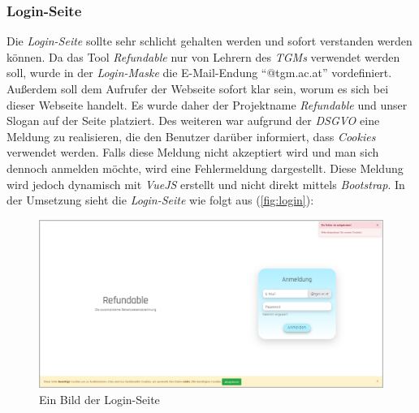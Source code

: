 \subsubsection{Login-Seite}
\label{chapter:implementierung-frontend-komponenten-login}
Die \textit{Login-Seite} sollte sehr schlicht gehalten werden und sofort verstanden werden können. Da das Tool \textit{Refundable} nur von Lehrern des \textit{TGMs} verwendet werden soll, wurde in der \textit{Login-Maske} die E-Mail-Endung \enquote{@tgm.ac.at} vordefiniert. Außerdem soll dem Aufrufer der Webseite sofort klar sein, worum es sich bei dieser Webseite handelt. Es wurde daher der Projektname \textit{Refundable} und unser Slogan auf der Seite platziert. Des weiteren war aufgrund der \textit{DSGVO} eine Meldung zu realisieren, die den Benutzer darüber informiert, dass \textit{Cookies} verwendet werden. Falls diese Meldung nicht akzeptiert wird und man sich dennoch anmelden möchte, wird eine Fehlermeldung dargestellt. Diese Meldung wird jedoch dynamisch mit \textit{VueJS} erstellt und nicht direkt mittels \textit{Bootstrap}. In der Umsetzung sieht die \textit{Login-Seite} wie folgt aus (\autoref{fig:login}):
\begin{figure}[H]
	\centering
	\includegraphics[width=1\linewidth]{images/ldehner_implementierung/login}
	\caption[Login Seite]{Ein Bild der Login-Seite}
	\label{fig:login}
\end{figure}
\newpage
